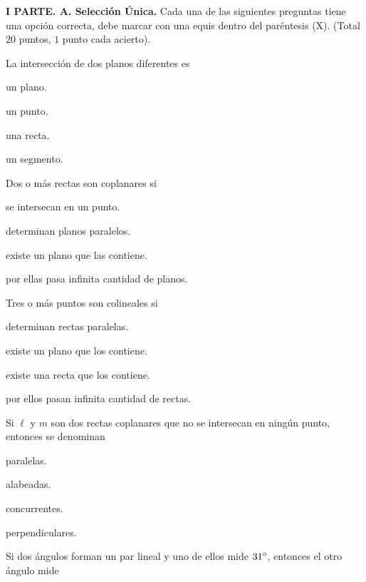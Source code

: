 \documentclass[12pt, fleqn]{article}
\begin{document}
\setcounter{page}{2} 

\vspace{-1.5cm}


\sf

{\bf I PARTE. A. Selección Única.} Cada una de las siguientes preguntas tiene una opción correcta, debe marcar con una equis dentro del paréntesis (X). (Total $20$ puntos, $1$ punto cada acierto).

\benu
\item La intersección de dos planos diferentes es
\vp

\benu
\item[] \opc un plano.\vf
\item[] \opc un punto.\vf
\item[] \opc una recta.\vf
\item[] \opc un segmento.
\eenu
\vs

\item Dos o más rectas son coplanares si
\vp

\benu
\item[] \opc se intersecan en un punto.\vf
\item[] \opc determinan planos paralelos.\vf
\item[] \opc existe un plano que las contiene.\vf
\item[] \opc por ellas pasa infinita cantidad de planos.
\eenu
\vs

\item Tres o más puntos son colineales si
\vp

\benu
\item[] \opc determinan rectas paralelas.\vf
\item[] \opc existe un plano que los contiene.\vf
\item[] \opc existe una recta que los contiene.\vf
\item[] \opc por ellos pasan infinita cantidad de rectas.
\eenu
\vs

\item Si $\ell$ y $m$ son dos rectas coplanares que no se intersecan en ningún punto, entonces se de\-no\-mi\-nan
\vp

\benu
\item[] \opc paralelas.\vf
\item[] \opc alabeadas.\vf
\item[] \opc concurrentes.\vf
\item[] \opc perpendiculares.
\eenu

\pagebreak

\item Si dos ángulos forman un par lineal y uno de ellos mide $31^\circ$, entonces el otro ángulo mide \vspace{2mm}
\vp
\end{document}
